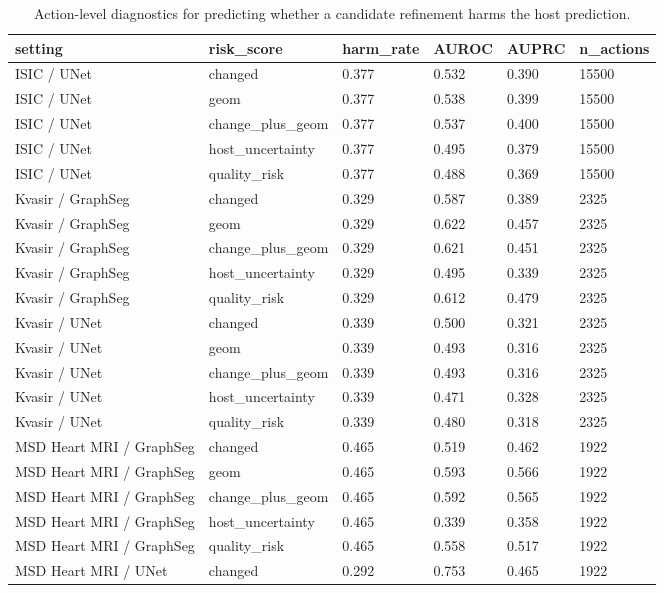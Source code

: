 \begin{table}[t]
\centering
\small
\caption{Action-level diagnostics for predicting whether a candidate refinement harms the host prediction.}
\label{tab:risk_diagnostics}
\begin{tabular}{llllll}
\toprule
setting & risk\_score & harm\_rate & AUROC & AUPRC & n\_actions \\
\midrule
ISIC / UNet & changed & 0.377 & 0.532 & 0.390 & 15500 \\
ISIC / UNet & geom & 0.377 & 0.538 & 0.399 & 15500 \\
ISIC / UNet & change\_plus\_geom & 0.377 & 0.537 & 0.400 & 15500 \\
ISIC / UNet & host\_uncertainty & 0.377 & 0.495 & 0.379 & 15500 \\
ISIC / UNet & quality\_risk & 0.377 & 0.488 & 0.369 & 15500 \\
Kvasir / GraphSeg & changed & 0.329 & 0.587 & 0.389 & 2325 \\
Kvasir / GraphSeg & geom & 0.329 & 0.622 & 0.457 & 2325 \\
Kvasir / GraphSeg & change\_plus\_geom & 0.329 & 0.621 & 0.451 & 2325 \\
Kvasir / GraphSeg & host\_uncertainty & 0.329 & 0.495 & 0.339 & 2325 \\
Kvasir / GraphSeg & quality\_risk & 0.329 & 0.612 & 0.479 & 2325 \\
Kvasir / UNet & changed & 0.339 & 0.500 & 0.321 & 2325 \\
Kvasir / UNet & geom & 0.339 & 0.493 & 0.316 & 2325 \\
Kvasir / UNet & change\_plus\_geom & 0.339 & 0.493 & 0.316 & 2325 \\
Kvasir / UNet & host\_uncertainty & 0.339 & 0.471 & 0.328 & 2325 \\
Kvasir / UNet & quality\_risk & 0.339 & 0.480 & 0.318 & 2325 \\
MSD Heart MRI / GraphSeg & changed & 0.465 & 0.519 & 0.462 & 1922 \\
MSD Heart MRI / GraphSeg & geom & 0.465 & 0.593 & 0.566 & 1922 \\
MSD Heart MRI / GraphSeg & change\_plus\_geom & 0.465 & 0.592 & 0.565 & 1922 \\
MSD Heart MRI / GraphSeg & host\_uncertainty & 0.465 & 0.339 & 0.358 & 1922 \\
MSD Heart MRI / GraphSeg & quality\_risk & 0.465 & 0.558 & 0.517 & 1922 \\
MSD Heart MRI / UNet & changed & 0.292 & 0.753 & 0.465 & 1922 \\

\end{tabular}
\end{table}
